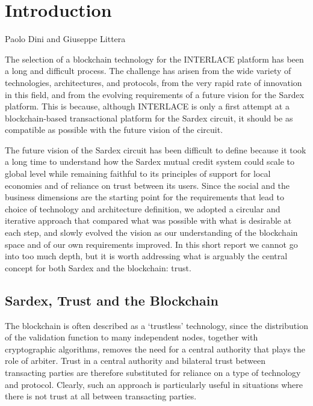 \chapter{Introduction}
\label{ch:Introduction}

\vspace{-1cm}
\begin{center}
Paolo Dini and Giuseppe Littera
\end{center}

The selection of a blockchain technology for the INTERLACE platform has been a long and difficult process. The challenge has arisen from the wide variety of technologies, architectures, and protocols, from the very rapid rate of innovation in this field, and from the evolving requirements of a future vision for the Sardex platform. This is because, although INTERLACE is only a first attempt at a blockchain-based transactional platform for the Sardex circuit, it should be as compatible as possible with the future vision of the circuit.

The future vision of the Sardex circuit has been difficult to define because it took a long time to understand how the Sardex mutual credit system could scale to global level while remaining faithful to its principles of support for local economies and of reliance on trust between its users. Since the social and the business dimensions are the starting point for the requirements that lead to choice of technology and architecture definition, we adopted a circular and iterative approach that compared what was possible with what is desirable at each step, and slowly evolved the vision as our understanding of the blockchain space and of our own requirements improved. In this short report we cannot go into too much depth, but it is worth addressing what is arguably the central concept for both Sardex and the blockchain: trust.

\section{Sardex, Trust and the Blockchain}
The blockchain is often described as a `trustless' technology, since the distribution of the validation function to many independent nodes, together with cryptographic algorithms, removes the need for a central authority that plays the role of arbiter. Trust in a central authority and bilateral trust between transacting parties are therefore substituted for reliance on a type of technology and protocol. Clearly, such an approach is particularly useful in situations where there is not trust at all between transacting parties.

